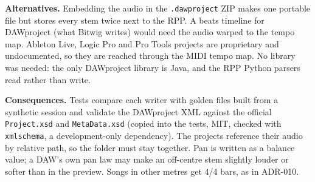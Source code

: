 \textbf{Alternatives.} Embedding the audio in the \texttt{.dawproject} ZIP
makes one portable file but stores every stem twice next to the RPP. A beats
timeline for DAWproject (what Bitwig writes) would need the audio warped to the
tempo map. Ableton Live, Logic Pro and Pro Tools projects are proprietary and
undocumented, so they are reached through the MIDI tempo map. No library was
needed: the only DAWproject library is Java, and the RPP Python parsers read
rather than write.

\textbf{Consequences.} Tests compare each writer with golden files built from a
synthetic session and validate the DAWproject XML against the official
\texttt{Project.xsd} and \texttt{MetaData.xsd} (copied into the tests, MIT,
checked with \texttt{xmlschema}, a development-only dependency). The projects
reference their audio by relative path, so the folder must stay together.
Pan is written as a balance value; a DAW's own pan law may make an off-centre
stem slightly louder or softer than in the preview. Songs in other metres get
4/4 bars, as in ADR-010.

